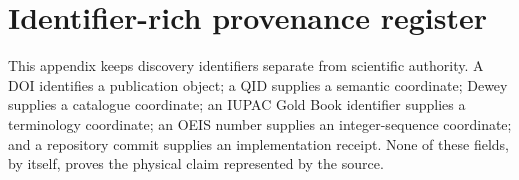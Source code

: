 
\section{Identifier-rich provenance register}

This appendix keeps discovery identifiers separate from scientific authority.
A DOI identifies a publication object; a QID supplies a semantic coordinate;
Dewey supplies a catalogue coordinate; an IUPAC Gold Book identifier supplies a
terminology coordinate; an OEIS number supplies an integer-sequence coordinate;
and a repository commit supplies an implementation receipt. None of these fields,
by itself, proves the physical claim represented by the source.

